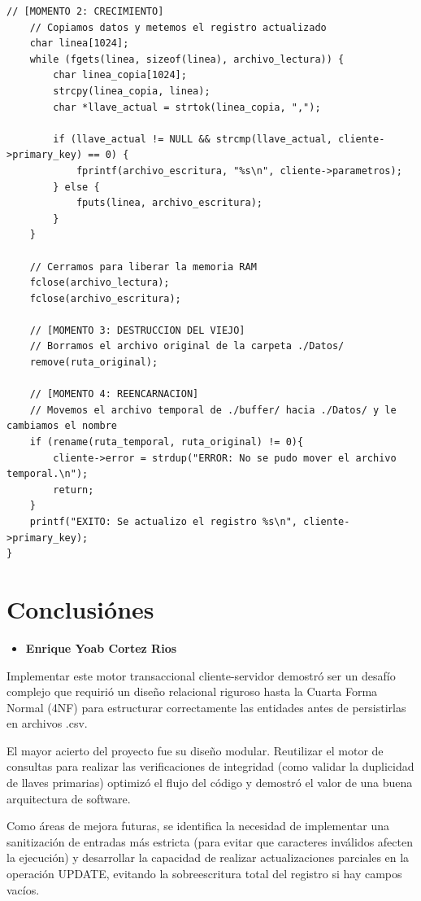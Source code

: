 \documentclass[12pt]{article}
\begin{document}
\begin{lstlisting}[style=estiloC ,title={Código 4. Servidor TCP (update.c)}]
    // [MOMENTO 2: CRECIMIENTO]
    // Copiamos datos y metemos el registro actualizado
    char linea[1024];
    while (fgets(linea, sizeof(linea), archivo_lectura)) {
        char linea_copia[1024];
        strcpy(linea_copia, linea);
        char *llave_actual = strtok(linea_copia, ",");

        if (llave_actual != NULL && strcmp(llave_actual, cliente->primary_key) == 0) {
            fprintf(archivo_escritura, "%s\n", cliente->parametros);
        } else {
            fputs(linea, archivo_escritura);
        }
    }

    // Cerramos para liberar la memoria RAM
    fclose(archivo_lectura);
    fclose(archivo_escritura);

    // [MOMENTO 3: DESTRUCCION DEL VIEJO]
    // Borramos el archivo original de la carpeta ./Datos/
    remove(ruta_original);

    // [MOMENTO 4: REENCARNACION]
    // Movemos el archivo temporal de ./buffer/ hacia ./Datos/ y le cambiamos el nombre
    if (rename(ruta_temporal, ruta_original) != 0){
        cliente->error = strdup("ERROR: No se pudo mover el archivo temporal.\n");
        return;
    }
    printf("EXITO: Se actualizo el registro %s\n", cliente->primary_key);
}
\end{lstlisting}





\newpage
\section{Conclusiónes}

\begin{itemize}
    \item \textbf{Enrique Yoab Cortez Rios}
\end{itemize}

Implementar este motor transaccional cliente-servidor demostró ser un desafío complejo que requirió un diseño relacional riguroso hasta la Cuarta Forma Normal (4NF) para estructurar correctamente las entidades antes de persistirlas en archivos .csv.

El mayor acierto del proyecto fue su diseño modular. Reutilizar el motor de consultas para realizar las verificaciones de integridad (como validar la duplicidad de llaves primarias) optimizó el flujo del código y demostró el valor de una buena arquitectura de software.

Como áreas de mejora futuras, se identifica la necesidad de implementar una sanitización de entradas más estricta (para evitar que caracteres inválidos afecten la ejecución) y desarrollar la capacidad de realizar actualizaciones parciales en la operación UPDATE, evitando la sobreescritura total del registro si hay campos vacíos.
\end{document}
